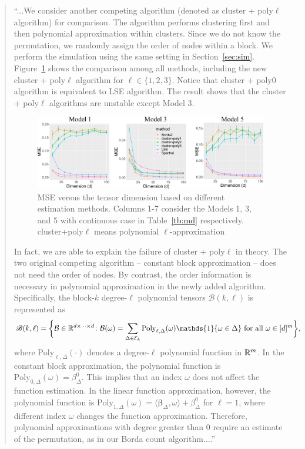 \documentclass[11pt]{article}
\theoremstyle{plain}
\theoremstyle{definition}
\def\caliB{\mathscr{B}}
\begin{document}
\begin{enumerate}[wide, labelwidth=!, labelindent=0pt]
   \begin{quote}
   \color{blue}
 ``...We consider another competing algorithm (denoted as cluster + poly$\ell$ algorithm) for comparison. The algorithm performs clustering first and then polynomial approximation within clusters. Since we do not know the permutation, we randomly assign the order of nodes within a block. We perform the simulation using the same setting in Section~\ref{sec:sim}. 
Figure~\ref{fig:method2} shows the comparison among all methods, including the new cluster + poly$\ell$ algorithm for $\ell\in\{1,2,3\}$. Notice that cluster + poly0 algorithm is equivalent to LSE algorithm. The result shows that the cluster + poly$\ell$ algorithms are unstable except Model 3. 

\begin{figure}[ht]
    \centering
    \includegraphics[width = \textwidth]{figure/newalg.pdf}   
    \caption{MSE versus the tensor dimension based on different estimation methods. Columns 1-7 consider the Models 1, 3, and 5 with continuous case in Table~\ref{tb:md} respectively. cluster+poly$\ell$ means polynomial $\ell$-approximation}
    \label{fig:method2}
\end{figure}

   
In fact, we are able to explain the failure of cluster + poly$\ell$ in theory. The two original competing algorithm -- constant block approximation -- does not need the order of nodes. By contrast, the order information is necessary in polynomial approximation in the newly added algorithm. Specifically, the block-$k$ degree-$\ell$ polynomial tensors $\caliB(k,\ell)$ is represented as
\begin{align}\label{eq:polynomial}
    \caliB(k,\ell) = \bigg\{&\tB\in \bbR^{d\times \cdots \times d}\colon \tB(\omega) = \sum_{\Delta\in\tE_k}\text{Poly}_{\ell,\Delta}(\omega)\mathds{1}\{\omega\in\Delta\}\text{ for all } \omega\in[d]^m\bigg\},
\end{align}
where $\text{Poly}_{\ell,\Delta}(\cdot)$ denotes a degree-$\ell$ polynomial function in $\mathbb{R}^m$. In the constant block approximation, the polynomial function is   $\text{Poly}_{0,\Delta}(\omega)= \beta^0_{\Delta}$. This implies that an index  $\omega$ does not affect the function estimation. In the linear function approximation,  however,  the polynomial function is $\text{Poly}_{1,\Delta}(\omega)=\langle \boldsymbol{\beta}_{\Delta},\omega\rangle+\beta_{\Delta}^0$ for $\ell=1$, where different index $\omega$ changes the function approximation. Therefore, polynomial approximations with degree greater than 0 require an estimate of the permutation, as in our Borda count algorithm....''
\end{quote}

\end{enumerate}






\end{document}
